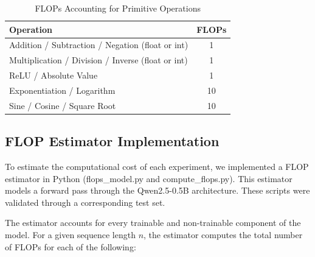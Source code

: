 \documentclass[a4paper,12pt]{article}
\begin{document}
\begin{table}[H]
  \centering

  \begin{tabular}{lc}
    \hline
    Operation & FLOPs \\
    \hline
    Addition / Subtraction / Negation (float or int) & 1 \\
    Multiplication / Division / Inverse (float or int) & 1 \\
    ReLU / Absolute Value & 1 \\
    Exponentiation / Logarithm & 10 \\
    Sine / Cosine / Square Root & 10 \\
    \hline
  \end{tabular}
  \vspace{0.2cm}
  \caption{FLOPs Accounting for Primitive Operations}
  \label{tab:flops_primitives}
\end{table}

\subsection*{FLOP Estimator Implementation}

To estimate the computational cost of each experiment, we implemented a FLOP estimator in Python (flops\_model.py and compute\_flops.py). This estimator models a forward pass through the Qwen2.5-0.5B architecture. These scripts were validated through a corresponding test set.

The estimator accounts for every trainable and non-trainable component of the model. For a given sequence length $n$, the estimator computes the total number of FLOPs for each of the following:
\end{document}
